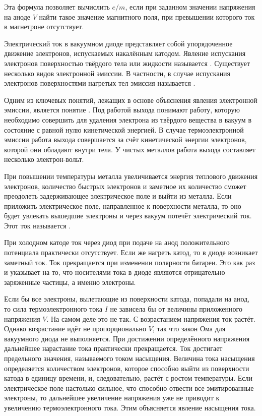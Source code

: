 Эта формула позволяет вычислить $e/m$, если при заданном значении напряжения на аноде $V$ найти такое значение
магнитного поля, при превышении которого ток в магнетроне отсутствует.


Электрический ток в вакуумном диоде представляет собой упорядоченное движение электронов, испускаемых накалённым
катодом. Явление испускания электронов поверхностью твёрдого тела или жидкости называется {}.
Существует несколько видов электронной эмиссии. В частности, в случае испускания электронов поверхностями нагретых тел эмиссия называется {}.

Одним из ключевых понятий, лежащих в основе объяснения явления электронной эмиссии, является понятие {}. Под работой выхода понимают работу, которую необходимо совершить для удаления электрона из твёрдого вещества в вакуум в состояние с равной нулю кинетической энергией. В случае термоэлектронной эмиссии работа выхода совершается за счёт кинетической энергии электронов, которой они обладают внутри тела. У чистых металлов работа выхода составляет несколько электрон-вольт.

При повышении температуры металла увеличивается энергия теплового движения электронов, количество быстрых электронов и заметное их количество сможет преодолеть задерживающее электрическое поле и выйти из металла. Если приложить
электрическое поле, направленное к поверхности металла, то оно будет увлекать вышедшие электроны и через вакуум потечёт электрический ток. Этот ток называется {}.

При холодном катоде ток через диод при подаче на анод положительного потенциала практически отсутствует. Если же нагреть катод, то в диоде возникает заметный ток. Ток прекращается при изменении полярности батареи. Это как раз и указывает на то, что носителями тока в диоде являются отрицательно заряженные частицы, а именно электроны.

Если бы все электроны, вылетающие из поверхности катода, попадали на анод, то сила термоэлектронного тока $I$ не
зависела бы от величины приложенного напряжения $V$. На самом деле это не так. С возрастанием напряжения ток растёт.
Однако возрастание идёт не пропорционально $V$, так что закон Ома для вакуумного диода не выполняется. При достижении определённого напряжения дальнейшее нарастание тока практически прекращается. Ток достигает предельного значения, называемого током насыщения. Величина тока насыщения определяется количеством электронов, которое способно выйти из поверхности катода в единицу времени, и, следовательно, растёт с ростом температуры. Если электрическое поле настолько сильное, что способно отвести все эмитированные электроны, то дальнейшее увеличение напряжения уже не приводит к увеличению термоэлектронного тока. Этим объясняется явление насыщения тока.

